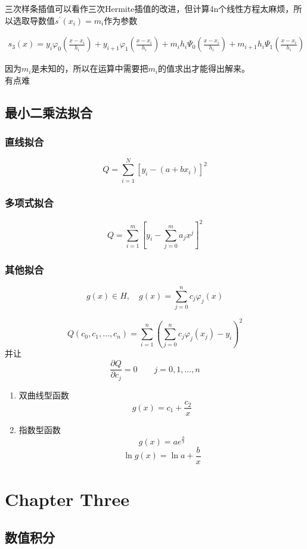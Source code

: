 \documentclass[12pt]{report}
\numberwithin{equation}{section}
\begin{document}
	三次样条插值可以看作三次Hermite插值的改进，但计算4n个线性方程太麻烦，所以选取导数值$s^\prime (x_i) = m_i$作为参数

	\begin{equation}  \tag{2.19} \label{2.19}
		\begin{aligned}
			s_3 (x) = y_i \varphi_0 (\frac{x - x_i}{h_i}) + y_{i+1} \varphi_1 (\frac{x - x_i}{h_i}) + m_i h_i \Psi_0 (\frac{x - x_i}{h_i}) + m_{i+1} h_i \Psi_1 (\frac{x - x_i}{h_i})
		\end{aligned}
	\end{equation}
	
	因为$m_i$是未知的，所以在运算中需要把$m_i$的值求出才能得出解来。 \\
	有点难

	\subsection{最小二乘法拟合}

	\subsubsection{直线拟合}
	$$
	Q = \sum_{i=1}^N \left[y_i - \left(a + b x_i\right)\right]^2
	$$

	\subsubsection{多项式拟合}
	$$
	Q = \sum_{i=1}^m \left[y_i - \sum_{j=0}^m a_j x^j \right]^2
	$$

	\subsubsection{其他拟合}
	$$
	g(x) \in H , \quad g(x) = \sum_{j=0}^n c_j \varphi_j (x) 
	$$
	
	$$
	Q(c_0 , c_1 , \ldots , c_n) = \sum_{i=1}^n \left(\sum_{j=0}^n c_j \varphi_j (x_j) - y_i\right)^2
	$$
	并让
	$$
	\frac{\partial Q}{\partial c_j} = 0  \quad \quad j = 0, 1, \ldots , n
	$$

	\begin{enumerate}
		\item 双曲线型函数
		$$
		g(x) = c_1 + \frac{c_2}{x}
		$$
		\item 指数型函数
		$$
		g(x) = ae^{\frac{b}{x}}
		$$
		$$
		\ln g(x) = \ln a + \frac{b}{x}
		$$
	\end{enumerate}

	\section{Chapter Three}
	
	\subsection{数值积分}
\end{document}
